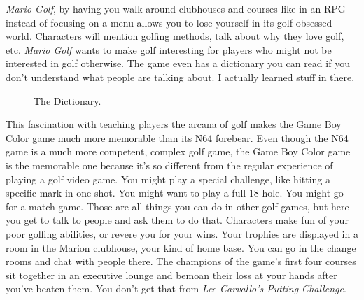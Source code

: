 \documentclass{book}
\begin{document}
\par\justifying
\emph{Mario Golf}, by having you walk around clubhouses and courses like in an RPG instead of focusing on a menu allows you to lose yourself in its golf-obsessed world. Characters will mention golfing methods, talk about why they love golf, etc. \emph{Mario Golf} wants to make golf interesting for players who might not be interested in golf otherwise. The game even has a dictionary you can read if you don’t understand what people are talking about. I actually learned stuff in there.\par
\FloatBarrier\vspace{\baselineskip}\begin{figure}[H]\caption*{The Dictionary.}\end{figure}
This fascination with teaching players the arcana of golf makes the Game Boy Color game much more memorable than its N64 forebear. Even though the N64 game is a much more competent, complex golf game, the Game Boy Color game is the memorable one because it’s so different from the regular experience of playing a golf video game. You might play a special challenge, like hitting a specific mark in one shot. You might want to play a full 18-hole. You might go for a match game. Those are all things you can do in other golf games, but here you get to talk to people and ask them to do that. Characters make fun of your poor golfing abilities, or revere you for your wins. Your trophies are displayed in a room in the Marion clubhouse, your kind of home base. You can go in the change rooms and chat with people there. The champions of the game’s first four courses sit together in an executive lounge and bemoan their loss at your hands after you’ve beaten them. You don’t get that from \emph{Lee Carvallo’s Putting Challenge}.\par
\FloatBarrier\vspace{\baselineskip}\begin{figure}[H]\end{figure}
\end{document}
